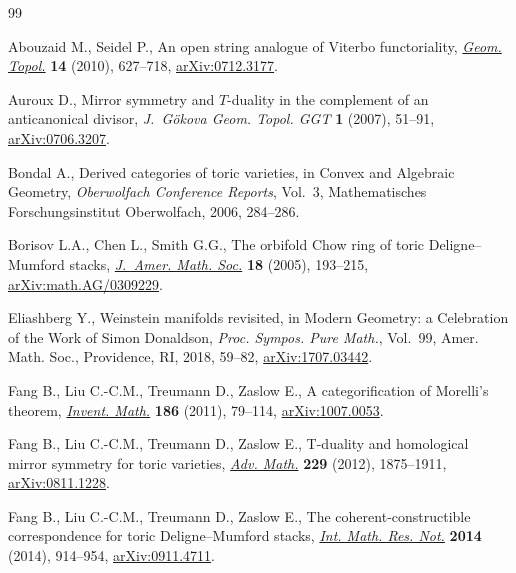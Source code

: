 \begin{thebibliography}{99}
\footnotesize\itemsep=0pt

Abouzaid M., Seidel P., An open string analogue of {V}iterbo functoriality,
 \href{https://doi.org/10.2140/gt.2010.14.627}{\textit{Geom. Topol.}} \textbf{14} (2010), 627--718, \href{https://arxiv.org/abs/0712.3177}{arXiv:0712.3177}.

Auroux D., Mirror symmetry and {$T$}-duality in the complement of an
 anticanonical divisor, \textit{J.~G\"okova Geom. Topol. GGT} \textbf{1}
 (2007), 51--91, \href{https://arxiv.org/abs/0706.3207}{arXiv:0706.3207}.

Bondal A., Derived categories of toric varieties, in Convex and Algebraic
 Geometry, \textit{Oberwolfach Conference Reports}, Vol.~3, Mathematisches
 Forschungsinstitut Oberwolfach, 2006, 284--286.

Borisov L.A., Chen L., Smith G.G., The orbifold {C}how ring of toric
 {D}eligne--{M}umford stacks, \href{https://doi.org/10.1090/S0894-0347-04-00471-0}{\textit{J.~Amer. Math. Soc.}} \textbf{18} (2005),
 193--215, \href{https://arxiv.org/abs/math.AG/0309229}{arXiv:math.AG/0309229}.

Eliashberg Y., Weinstein manifolds revisited, in Modern Geometry: a Celebration
 of the Work of {S}imon {D}onaldson, \textit{Proc. Sympos. Pure Math.},
 Vol.~99, Amer. Math. Soc., Providence, RI, 2018, 59--82, \href{https://arxiv.org/abs/1707.03442}{arXiv:1707.03442}.

Fang B., Liu C.-C.M., Treumann D., Zaslow E., A categorification of {M}orelli's
 theorem, \href{https://doi.org/10.1007/s00222-011-0315-x}{\textit{Invent. Math.}} \textbf{186} (2011), 79--114,
 \href{https://arxiv.org/abs/1007.0053}{arXiv:1007.0053}.

Fang B., Liu C.-C.M., Treumann D., Zaslow E., T-duality and homological mirror
 symmetry for toric varieties, \href{https://doi.org/10.1016/j.aim.2011.10.022}{\textit{Adv. Math.}} \textbf{229} (2012),
 1875--1911, \href{https://arxiv.org/abs/0811.1228}{arXiv:0811.1228}.

Fang B., Liu C.-C.M., Treumann D., Zaslow E., The coherent-constructible
 correspondence for toric {D}eligne--{M}umford stacks, \href{https://doi.org/10.1093/imrn/rns235}{\textit{Int. Math. Res.
 Not.}} \textbf{2014} (2014), 914--954, \href{https://arxiv.org/abs/0911.4711}{arXiv:0911.4711}.


\end{thebibliography}
